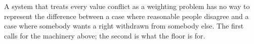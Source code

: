 A system that treats every value conflict as a weighting problem has no way to represent the difference between a case where reasonable people disagree and a case where somebody wants a right withdrawn from somebody else. The first calls for the machinery above; the second is what the floor is for.
